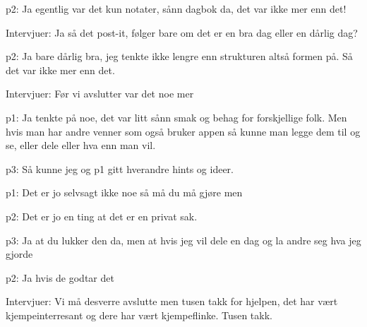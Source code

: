 \documentclass[11pt,UKenglish, a4paper]{article}
\begin{document}
\textcolor{myYellow} {p2:} Ja egentlig var det kun notater, sånn dagbok da, det var ikke mer enn det!

\textcolor{myBlue} {Intervjuer:} Ja så det post-it, følger bare om det er en bra dag eller en dårlig dag?

\textcolor{myYellow} {p2:} Ja bare dårlig bra, jeg tenkte ikke lengre enn strukturen altså formen på. Så det var ikke mer enn det.

\textcolor{myBlue} {Intervjuer:} Før vi avslutter var det noe mer

\textcolor{myGreen} {p1:} Ja tenkte på noe, det var litt sånn smak og behag for forskjellige folk. Men hvis man har andre venner som også bruker appen så kunne man legge dem til og se, eller dele eller hva enn man vil.

\textcolor{myR} {p3:} Så kunne jeg og p1 gitt hverandre hints og ideer.

\textcolor{myGreen} {p1:} Det er jo selvsagt ikke noe så må du må gjøre men

\textcolor{myYellow} {p2:} Det er jo en ting at det er en privat sak.

\textcolor{myR} {p3:} Ja at du lukker den da, men at hvis jeg vil dele en dag og la andre seg hva jeg gjorde

\textcolor{myYellow} {p2:} Ja hvis de godtar det

\textcolor{myBlue} {Intervjuer:} Vi må desverre avslutte men tusen takk for hjelpen, det har vært kjempeinterresant og dere har vært kjempeflinke. Tusen takk.
\end{document}
